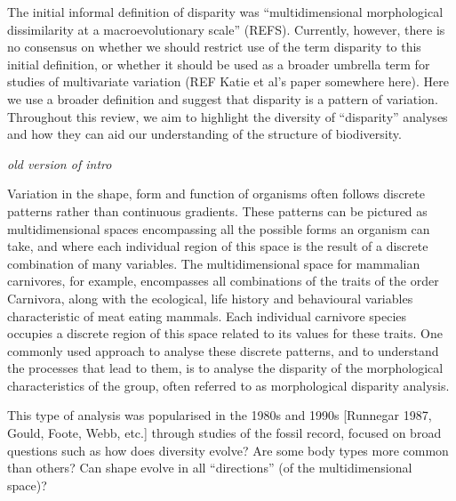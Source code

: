 \documentclass[12pt,letterpaper]{article}
\renewcommand{\subsection}[1]{%
\bigskip
\begin{center}
\begin{large}
\normalfont\itshape #1
\end{large}
\end{center}}
\begin{document}
The initial informal definition of disparity was ``multidimensional morphological dissimilarity at a macroevolutionary scale'' (REFS).
Currently, however, there is no consensus on whether we should restrict use of the term disparity to this initial definition, or whether it should be used as a broader umbrella term for studies of multivariate variation (REF Katie et al's paper somewhere here). 
Here we use a broader definition and suggest that disparity is a pattern of variation.
Throughout this review, we aim to highlight the diversity of ``disparity'' analyses and how they can aid our understanding of the structure of biodiversity.

\subsection{old version of intro}
Variation in the shape, form and function of organisms often follows discrete patterns rather than continuous gradients.
These patterns can be pictured as multidimensional spaces encompassing all the possible forms an organism can take, and where each individual region of this space is the result of a discrete combination of many variables.
The multidimensional space for mammalian carnivores, for example, encompasses all combinations of the traits of the order Carnivora, along with the ecological, life history and behavioural variables characteristic of meat eating mammals.
Each individual carnivore species occupies a discrete region of this space related to its values for these traits.
One commonly used approach to analyse these discrete patterns, and to understand the processes that lead to them, is to analyse the disparity of the morphological characteristics of the group, often referred to as morphological disparity analysis.


This type of analysis was popularised in the 1980s and 1990s [Runnegar 1987, Gould, Foote, Webb, etc.] through studies of the fossil record, focused on broad questions such as how does diversity evolve? Are some body types more common than others? Can shape evolve in all ``directions'' (of the multidimensional space)?
\end{document}
